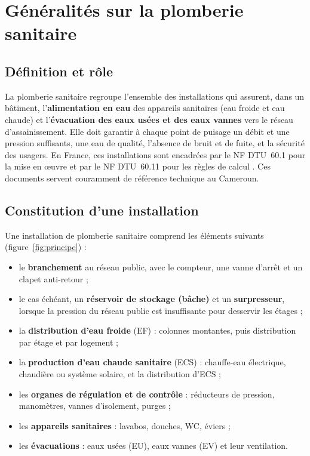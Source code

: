 
\section{Généralités sur la plomberie sanitaire}

\subsection{Définition et rôle}
La plomberie sanitaire regroupe l'ensemble des installations qui assurent, dans un bâtiment,
l'\textbf{alimentation en eau} des appareils sanitaires (eau froide et eau chaude) et
l'\textbf{évacuation des eaux usées et des eaux vannes} vers le réseau d'assainissement. Elle
doit garantir à chaque point de puisage un débit et une pression suffisants, une eau de
qualité, l'absence de bruit et de fuite, et la sécurité des usagers. En France, ces
installations sont encadrées par le NF DTU~60.1 pour la mise en œuvre et par le NF DTU~60.11
pour les règles de calcul \cite{dtu601,dtu6011}. Ces documents servent couramment de
référence technique au Cameroun.

\subsection{Constitution d'une installation}
Une installation de plomberie sanitaire comprend les éléments suivants
(figure~\ref{fig:principe}) :
\begin{itemize}
  \item le \textbf{branchement} au réseau public, avec le compteur, une vanne d'arrêt et un
        clapet anti-retour ;
  \item le cas échéant, un \textbf{réservoir de stockage (bâche)} et un \textbf{surpresseur},
        lorsque la pression du réseau public est insuffisante pour desservir les étages ;
  \item la \textbf{distribution d'eau froide} (EF) : colonnes montantes, puis distribution par
        étage et par logement ;
  \item la \textbf{production d'eau chaude sanitaire} (ECS) : chauffe-eau électrique,
        chaudière ou système solaire, et la distribution d'ECS ;
  \item les \textbf{organes de régulation et de contrôle} : réducteurs de pression, manomètres,
        vannes d'isolement, purges ;
  \item les \textbf{appareils sanitaires} : lavabos, douches, WC, éviers ;
  \item les \textbf{évacuations} : eaux usées (EU), eaux vannes (EV) et leur ventilation.
\end{itemize}


